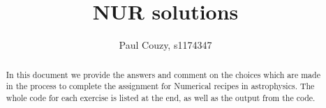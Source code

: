 \documentclass[a4paper,10pt]{article}
\title{NUR solutions}
\author{Paul Couzy, s1174347}
\begin{document}
\maketitle

\begin{abstract}
 In this document we provide the answers and comment on the choices which are made in the process to complete the assignment for Numerical recipes in astrophysics. The whole code for each exercise is listed at the end, as well as the output from the code. 
\end{abstract}















\end{document}
